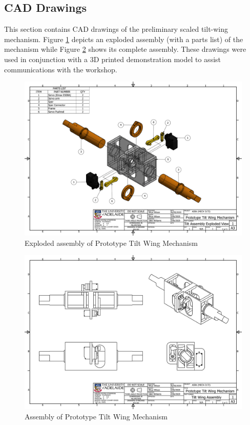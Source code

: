 \begin{appendices}




\newpage

\section{CAD Drawings}
\label{app_CAD}

This section contains CAD drawings of the preliminary scaled tilt-wing mechanism. Figure \ref{fig:explode} depicts an exploded assembly (with a parts list) of the mechanism while Figure \ref{fig:assembly} shows its complete assembly. These drawings were used in conjunction with a 3D printed demonstration model to assist communications with the workshop. 

\begin{figure}[H]
    \centering
    \includegraphics[width = \textwidth]{Tiltwing/Tilt Assembly Exploded View.pdf}
    \caption{Exploded assembly of Prototype Tilt Wing Mechanism}
    \label{fig:explode}
\end{figure}

\begin{figure}[H]
    \centering
    \includegraphics[width = \textwidth]{Tiltwing/Tilt Assembly.pdf}
    \caption{Assembly of Prototype Tilt Wing Mechanism}
    \label{fig:assembly}
\end{figure}


\end{appendices}
